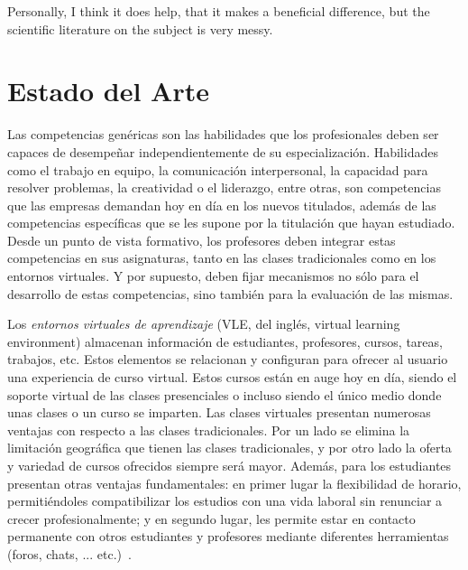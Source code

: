 

\begin{savequote}[50mm]
Personally, I think it does help, that it makes a beneficial difference, but the scientific literature on the subject is very messy.
%
\end{savequote}


\chapter{Estado del Arte}
\label{cha:State of the Art}

\ifpdf
    \graphicspath{{2_state_of_the_art/figures/PNG/}{2_state_of_the_art/figures/PDF/}{2_state_of_the_art/figures/}}
\else
    \graphicspath{{2_state_of_the_art/figures/EPS/}{2_state_of_the_art/figures/}}
\fi



Las competencias genéricas son las habilidades que los profesionales deben ser capaces de desempeñar independientemente de su especialización. Habilidades como el trabajo en equipo, la comunicación interpersonal, la capacidad para resolver problemas, la creatividad o el liderazgo, entre otras, son competencias que las empresas demandan hoy en día en los nuevos titulados, además de las competencias específicas que se les supone por la titulación que hayan estudiado. Desde un punto de vista formativo, los profesores deben integrar estas competencias en sus asignaturas, tanto en las clases tradicionales como en los entornos virtuales. Y por supuesto, deben fijar mecanismos no sólo para el desarrollo de estas competencias, sino también para la evaluación de las mismas.

Los \emph{entornos virtuales de aprendizaje} (VLE, del inglés, virtual learning environment) almacenan información de estudiantes, profesores, cursos, tareas, trabajos, etc. Estos elementos se relacionan y configuran para ofrecer al usuario una experiencia de curso virtual. Estos cursos están en auge hoy en día, siendo el soporte virtual de las clases presenciales o incluso siendo el único medio donde unas clases o un curso se imparten. Las clases virtuales presentan numerosas ventajas con respecto a las clases tradicionales. Por un lado se elimina la limitación geográfica que tienen las clases tradicionales, y por otro lado la oferta y variedad de cursos ofrecidos siempre será mayor. Además, para los estudiantes presentan otras ventajas fundamentales: en primer lugar la flexibilidad de horario, permitiéndoles compatibilizar los estudios con una vida laboral sin renunciar a crecer profesionalmente; y en segundo lugar, les permite estar en contacto permanente con otros estudiantes y profesores mediante diferentes herramientas (foros, chats, ... etc.)~\cite{alAjlan:2008}.

